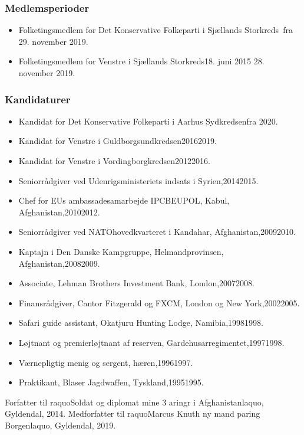 \documentclass[11pt, a4paper]{awesome-cv}
\begin{document}
\begin{cvletter}
\subsubsection*{Medlemsperioder}
\begin{itemize}
\item Folketingsmedlem for Det Konservative Folkeparti i Sjællands Storkreds fra 29. november 2019.
\item Folketingsmedlem for Venstre i Sjællands Storkreds18. juni 2015  28. november 2019.
\end{itemize}
\subsubsection*{Kandidaturer}
\begin{itemize}
\item Kandidat for Det Konservative Folkeparti i Aarhus Sydkredsenfra 2020.
\item Kandidat for Venstre i Guldborgsundkredsen20162019.
\item Kandidat for Venstre i Vordingborgkredsen20122016.
\end{itemize}
\begin{itemize}
\item Seniorrådgiver ved Udenrigsministeriets indsats i Syrien,20142015.
\item Chef for EUs ambassadesamarbejde IPCBEUPOL, Kabul, Afghanistan,20102012.
\item Seniorrådgiver ved NATOhovedkvarteret i Kandahar, Afghanistan,20092010.
\item Kaptajn i Den Danske Kampgruppe, Helmandprovinsen, Afghanistan,20082009.
\item Associate, Lehman Brothers Investment Bank, London,20072008.
\item Finansrådgiver, Cantor Fitzgerald og FXCM, London og New York,20022005.
\item Safari guide assistant, Okatjuru Hunting Lodge, Namibia,19981998.
\item Løjtnant og premierløjtnant af reserven, Gardehusarregimentet,19971998.
\item Værnepligtig menig og sergent, hæren,19961997.
\item Praktikant, Blaser Jagdwaffen, Tyskland,19951995.
\end{itemize}
Forfatter til raquoSoldat og diplomat  mine 3 aringr i Afghanistanlaquo, Gyldendal, 2014. Medforfatter til raquoMarcus Knuth  ny mand paring Borgenlaquo, Gyldendal, 2019.

\end{cvletter}
\end{document}

